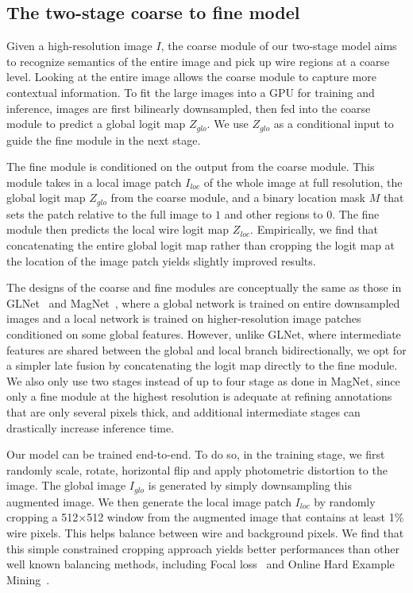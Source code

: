 \subsection{The two-stage coarse to fine model}

Given a high-resolution image $I$, the coarse module of our two-stage model aims to recognize semantics of the entire image and pick up wire regions at a coarse level. Looking at the entire image allows the coarse module to capture more contextual information. To fit the large images into a GPU for training and inference, images are first bilinearly downsampled, then fed into the coarse module to predict a global logit map $Z_{glo}$. We use $Z_{glo}$ as a conditional input to guide the fine module in the next stage.

The fine module is conditioned on the output from the coarse module. This module takes in a local image patch $I_{loc}$ of the whole image at full resolution, the global logit map $Z_{glo}$ from the coarse module, and a binary location mask $M$ that sets the patch relative to the full image to $1$ and other regions to $0$. The fine module then predicts the local wire logit map $Z_{loc}$. Empirically, we find that concatenating the entire global logit map rather than cropping the logit map at the location of the image patch yields slightly improved results.

The designs of the coarse and fine modules are conceptually the same as those in GLNet~\cite{glnet} and MagNet~\cite{magnet}, where a global network is trained on entire downsampled images and a local network is trained on higher-resolution image patches conditioned on some global features. However, unlike GLNet, where intermediate features are shared between the global and local branch bidirectionally, we opt for a simpler late fusion by concatenating the logit map directly to the fine module. We also only use two stages instead of up to four stage as done in MagNet, since only a fine module at the highest resolution is adequate at refining annotations that are only several pixels thick, and additional intermediate stages can drastically increase inference time.

Our model can be trained end-to-end. To do so, in the training stage, we first randomly scale, rotate, horizontal flip and apply photometric distortion to the image. The global image $I_{glo}$ is generated by simply downsampling this augmented image. We then generate the local image patch $I_{loc}$ by randomly cropping a 512$\times$512 window from the augmented image that contains at least 1\% wire pixels. This helps balance between wire and background pixels. We find that this simple constrained cropping approach yields better performances than other well known balancing methods, including Focal loss~\cite{focal} and Online Hard Example Mining~\cite{ohem}.

